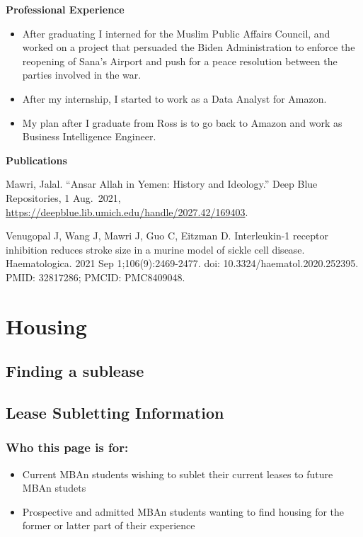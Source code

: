 \documentclass[
]{book}
\providecommand{\tightlist}{%
  \setlength{\itemsep}{0pt}\setlength{\parskip}{0pt}}
\begin{document}
\textbf{Professional Experience}

\begin{itemize}
\tightlist
\item
  After graduating I interned for the Muslim Public Affairs Council, and worked on a project that persuaded the Biden Administration to enforce the reopening of Sana's Airport and push for a peace resolution between the parties involved in the war.
\item
  After my internship, I started to work as a Data Analyst for Amazon.
\item
  My plan after I graduate from Ross is to go back to Amazon and work as Business Intelligence Engineer.
\end{itemize}

\textbf{Publications}

Mawri, Jalal. ``Ansar Allah in Yemen: History and Ideology.'' Deep Blue Repositories, 1 Aug.~2021, \url{https://deepblue.lib.umich.edu/handle/2027.42/169403}.

Venugopal J, Wang J, Mawri J, Guo C, Eitzman D. Interleukin-1 receptor inhibition reduces stroke size in a murine model of sickle cell disease. Haematologica. 2021 Sep 1;106(9):2469-2477. doi: 10.3324/haematol.2020.252395. PMID: 32817286; PMCID: PMC8409048.

\hypertarget{housing}{%
\chapter{Housing}\label{housing}}

\hypertarget{finding-a-sublease}{%
\section{Finding a sublease}\label{finding-a-sublease}}

\hypertarget{lease-subletting-information}{%
\section{Lease Subletting Information}\label{lease-subletting-information}}

\hypertarget{who-this-page-is-for}{%
\subsection{Who this page is for:}\label{who-this-page-is-for}}

\begin{itemize}
\tightlist
\item
  Current MBAn students wishing to sublet their current leases to future MBAn studets
\item
  Prospective and admitted MBAn students wanting to find housing for the former or latter part of their experience
\end{itemize}
\end{document}
